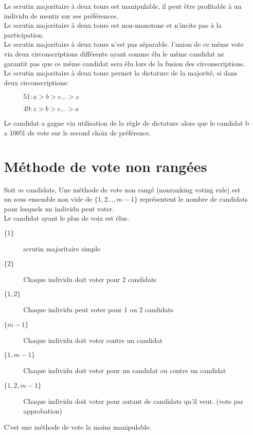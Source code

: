 Le scrutin majoritaire à deux tours est manipulable, il peut être profitable à un individu de mentir sur ses préférences.\\
Le scrutin majoritaire à deux tours est non-monotone et n'incite pas à la participation.\\
Le scrutin majoritaire à deux tours n'est pas séparable. l'union de ce même vote via deux circonscriptions différente ayant comme élu le même candidat ne garantit pas que ce même candidat sera élu lors de la fusion des circonscriptions.\\
Le scrutin majoritaire à deux tours permet la dictature de la majorité, si dans deux circonscriptions:
\begin{description}
\item[] $51: a > b > c ... > z$
\item[] $49: z > b > c ... > a$
\end{description}
Le candidat a gagne via utilisation de la règle de dictature alors que le candidat b a 100\% de vote sur le second choix de préférence.\\

\section{Méthode de vote non rangées}

Soit $m$ candidats, Une méthode de vote non rangé (nonranking voting rule) est un sous ensemble non vide de $\{1,2...,m-1\}$ représentent le nombre de candidats pour lesquels un individu peut voter.\\
Le candidat ayant le plus de voix est élus.\\
\begin{description}
\item[$\{1\}$] scrutin majoritaire simple
\item[$\{2\}$] Chaque individu doit voter pour 2 candidats
\item[$\{1,2\}$] Chaque individu peut voter pour 1 ou 2 candidats
\item[$\{m-1\}$] Chaque individu doit voter contre un candidat
\item[$\{1,m-1\}$] Chaque individu doit voter pour un candidat ou contre un candidat
\item[$\{1,2,m-1\}$] Chaque individu doit voter pour autant de candidats qu'il veut. (vote par approbation)
\end{description}

C'est une méthode de vote la moins manipulable.

